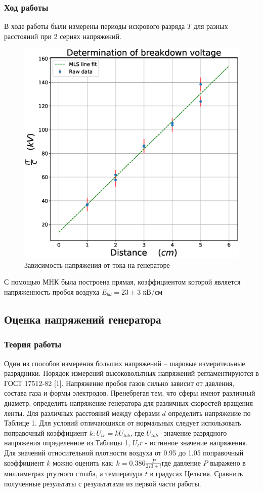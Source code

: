 \documentclass[a4paper,14pt]{extarticle}
\begin{document}
			\subsubsection{Ход работы}
				В ходе работы были измерены периоды искрового разряда $T$ для разных расстояний при 2 сериях напряжений.
				\begin{figure}[h]
					\centering
				 	\includegraphics[width=.80\linewidth]{Lab1_5.eps}
				 	\caption{Зависимость напряжения от тока на генераторе}
				 	\label{fig9}
				\end{figure}
				\newpage
				С помощью МНК была построена прямая, коэффициентом которой является напряженность пробоя воздуха $E_{bd} = 23 \pm 3$ кВ/см
		\subsection{Оценка напряжений генератора}
			\subsubsection{Теория работы}
				Один из способов измерения больших напряжений – шаровые измерительные разрядники. Порядок измерений высоковольтных напряжений регламентируются в ГОСТ 17512-82 [1]. Напряжение пробоя газов сильно зависит от давления, состава газа и формы
				электродов. Пренебрегая тем, что сферы имеют различный диаметр, определить напряжение генератора для различных скоростей вращения ленты. Для различных расстояний между сферами $d$ определить напряжение по Таблице 1. Для условий отличающихся от нормальных следует использовать поправочный
				коэффициент $k: U_{tr} = k U_{tab}$, где $U_{tab}$– значение разрядного напряжения определенное из Таблицы 1, $U_tr$ - истинное значение напряжения. Для значений относительной плотности воздуха от 0.95 до 1.05 поправочный коэффициент $k$ можно оценить как: $k = 0.386 \frac{P}{273+t}$где давление $P$ выражено в миллиметрах ртутного столба, а температура $t$ в градусах Цельсия.
				\newline
				Сравнить полученные результаты с результатами из первой части работы.
\end{document}
